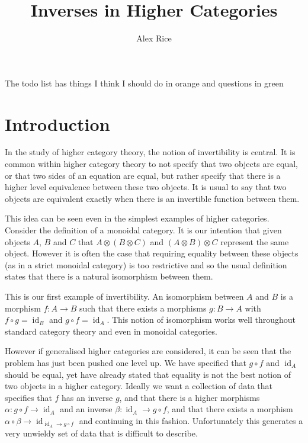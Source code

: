 \documentclass{article}
\title{Inverses in Higher Categories}
\author{Alex Rice}
\theoremstyle{definition}
\theoremstyle{remark}
\DeclareMathOperator{\id}{id}
\begin{document}
\maketitle

The todo list has things I think I should do in orange and questions in green
\listoftodos{}

\begin{abstract}
\end{abstract}
\section{Introduction}\label{sec:intro}

In the study of higher category theory, the notion of invertibility is central. It is common within higher category theory to not specify that two objects are equal, or that two sides of an equation are equal, but rather specify that there is a higher level equivalence between these two objects. It is usual to say that two objects are equivalent exactly when there is an invertible function between them.

This idea can be seen even in the simplest examples of higher categories. Consider the definition of a monoidal category. It is our intention that given objects \(A\), \(B\) and \(C\) that \(A \otimes (B \otimes C)\) and \((A \otimes B) \otimes C\) represent the same object. However it is often the case that requiring equality between these objects (as in a strict monoidal category) is too restrictive and so the usual definition states that there is a natural isomorphism between them.

This is our first example of invertibility. An isomorphism between \(A\) and \(B\) is a morphism \(f : A \to B\) such that there exists a morphisms \(g : B \to A\) with \(f \circ g = \id_B\) and \(g \circ f = \id_A\). This notion of isomorphism works well throughout standard category theory and even in monoidal categories.

However if generalised higher categories are considered, it can be seen that the problem has just been pushed one level up. We have specified that \(g \circ f\) and \(\id_A\) should be equal, yet have already stated that equality is not the best notion of two objects in a higher category. Ideally we want a collection of data that specifies that \(f\) has an inverse \(g\), and that there is a higher morphisms \(\alpha : g \circ f \to \id_A\) and an inverse \(\beta : \id_A \to g \circ f\), and that there exists a morphism \(\alpha \circ \beta \to \id_{\id_A \to g \circ f}\) and continuing in this fashion. Unfortunately this generates a very unwieldy set of data that is difficult to describe.
\end{document}
